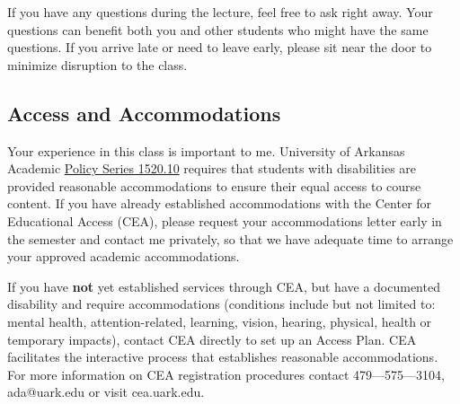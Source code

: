 \documentclass[12pt]{article}
\begin{document}
If you have any questions during the lecture, feel free to ask right away. Your questions can benefit both you and other students who might have the same questions. If you arrive late or need to leave early, please sit near the door to minimize disruption to the class.

\subsection*{Access and Accommodations}

Your experience in this class is important to me. University of Arkansas Academic \href{https://policies.uark.edu/academic/152010.php}{Policy Series 1520.10} requires that students with disabilities are provided reasonable accommodations to ensure their equal access to course content. If you have already established accommodations with the Center for Educational Access (CEA), please request your accommodations letter early in the semester and contact me privately, so that we have adequate time to arrange your approved academic accommodations.

If you have \textbf{not} yet established services through CEA, but have a documented disability and require accommodations (conditions include but not limited to: mental health, attention-related, learning, vision, hearing, physical, health  or temporary impacts), contact CEA directly to set up an Access Plan. CEA facilitates the interactive process that establishes reasonable accommodations.  For more information on CEA registration procedures contact 479—575—3104, ada@uark.edu or visit cea.uark.edu.

\end{document}
